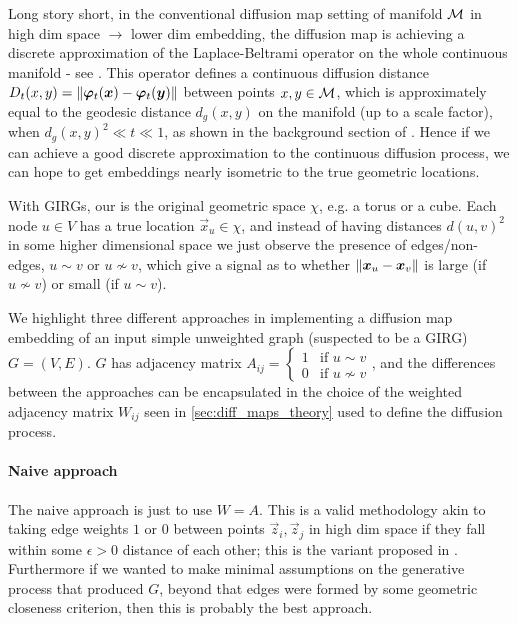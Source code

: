 Long story short, in the conventional diffusion map setting of manifold $\mathcal{M}$ in high dim space $\to$ lower dim embedding, the diffusion map is achieving a discrete approximation of the Laplace-Beltrami operator on the whole continuous manifold - see \cite{singer2006graph}. This operator defines a continuous diffusion distance $D_t(x, y) = \left\lVert \bm{\varphi}_t(\bm{x}) - \bm{\varphi}_t(\bm{y})\right\rVert$ between points $x, y \in \mathcal{M}$, which is approximately equal to the geodesic distance $d_g(x, y)$ on the manifold (up to a scale factor), when $d_g(x, y)^2 \ll t \ll 1$, as shown in the background section of \cite{berry2018iterated}. Hence if we can achieve a good discrete approximation to the continuous diffusion process, we can hope to get embeddings nearly isometric to the true geometric locations.

With GIRGs, our  is the original geometric space $\chi$, e.g. a torus or a cube. Each node $u \in V$ has a true location $\vec{x}_u \in \chi$, and instead of having distances $d(u, v)^2$ in some higher dimensional space we just observe the presence of edges/non-edges, $u \sim v$ or $u \nsim v$, which give a signal as to whether $\left\lVert \bm{x}_u - \bm{x}_v\right\rVert$ is large (if $u \nsim v$) or small (if $u \sim v$).

We highlight three different approaches in implementing a diffusion map embedding of an input simple unweighted graph (suspected to be a GIRG) $G=(V, E)$.
$G$ has adjacency matrix $A_{ij} = \begin{cases} 1 & \text{if } u \sim v \\ 0 & \text{if } u \nsim v \end{cases}$, and the differences between the approaches can be encapsulated in the choice of the weighted adjacency matrix $W_{ij}$ seen in \cref{sec:diff_maps_theory} used to define the diffusion process.

\paragraph{Naive approach}
The naive approach is just to use $W = A$. This is a valid methodology akin to taking edge weights $1$ or $0$ between points $\vec{z}_i, \vec{z}_j$ in high dim space if they fall within some $\epsilon > 0$ distance of each other; this is the  variant proposed in \cite{belkin2001laplacian}. Furthermore if we wanted to make minimal assumptions on the generative process that produced $G$, beyond that edges were formed by some geometric closeness criterion, then this is probably the best approach.

